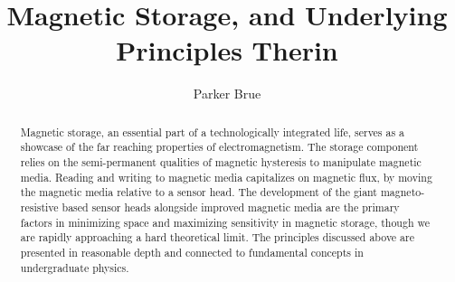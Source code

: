 \documentclass[11pt]{article}
\title{Magnetic Storage, and Underlying Principles Therin}
\author{Parker Brue}
\begin{document}
\maketitle
\begin{abstract}
Magnetic storage, an essential part of a technologically integrated life, serves as a showcase of the far reaching properties of electromagnetism. The storage component relies on the semi-permanent qualities of magnetic hysteresis to manipulate magnetic media. Reading and writing to magnetic media capitalizes on magnetic flux, by moving the magnetic media relative to a sensor head. The development of the giant magneto-resistive based sensor heads alongside improved magnetic media are the primary factors in minimizing space and maximizing sensitivity in magnetic storage, though we are rapidly approaching a hard theoretical limit.  The principles discussed above are presented in reasonable depth and connected to fundamental concepts in undergraduate physics.
\end{abstract}
\thispagestyle{fancy}
\end{document}
